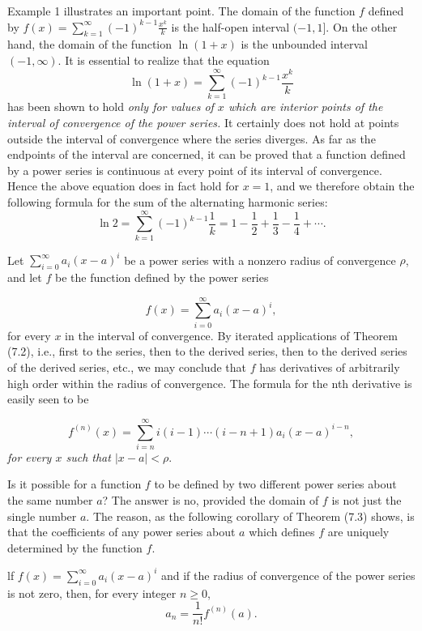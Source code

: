 Example 1 illustrates an important point. The domain of the function $f$ defined by $f(x) = \sum_{k=1}^\infty (-1)^{k-1} \frac{x^k}{k} $ is the half-open interval $(-1, 1]$. On the other hand, the domain of the function $\ln(1 + x)$ is the unbounded interval $(-1, \infty)$. It is essential to realize that the equation
$$
\ln (1 + x) = \sum_{k=1}^\infty (-1)^{k-1} \frac{x^k}{k} 
$$
\noindent has been shown to hold \textit{only for values of $x$ which are interior points of the interval of convergence of the power series.} It certainly does not hold at points outside the interval of convergence where the series diverges. As far as the endpoints of the interval are concerned, it can be proved that a function defined by a power series is continuous at every point of its interval of convergence. Hence the above equation does in fact hold for $x = 1$, and we therefore obtain the following formula for the sum of the alternating harmonic series:
$$
\ln 2 = \sum_{k=1}^\infty (-1)^{k-1} \frac{1}{k} = 1 - \frac{1}{2} + \frac{1}{3} - \frac{1}{4} + \cdots .
$$

Let $\sum_{i=0}^\infty a_{i}(x - a)^i$ be a power series with a nonzero radius of convergence $\rho$, and let $f$ be the function defined by the power series 

$$
f(x) = \sum_{i=0}^\infty a_{i}(x - a)^i, 
$$
for every $x$ in the interval of convergence. By iterated applications of Theorem (7.2), i.e., first to the series, then to the derived series, then to the derived series of the derived series, etc., we may conclude that $f$ has derivatives of arbitrarily high order within the radius of convergence. The formula for the nth derivative is easily seen to be

\begin{theorem} %
$$
f^{(n)}(x) = \sum_{i=n}^\infty i(i - 1) \cdots (i - n + 1)a_i(x - a)^{i-n} ,
$$
\noindent \textit{for every $x$ such that $|x - a| < \rho$}.
\end{theorem}

Is it possible for a function $f$ to be defined by two different power series about the same number $a$? The answer is no, provided the domain of $f$ is not just the single number $a$. The reason, as the following corollary of Theorem (7.3) shows, is that the coefficients of any power series about $a$ which defines $f$ are uniquely determined by the function $f$.

\begin{theorem} %
lf $f(x) = \sum_{i=0}^\infty a_i(x-a)^i$ and if the radius of convergence of the power series is not zero, then, for every integer $n \geq 0$,
$$
a_n = \frac{1}{n!} f^{(n)}(a).
$$
\end{theorem}

